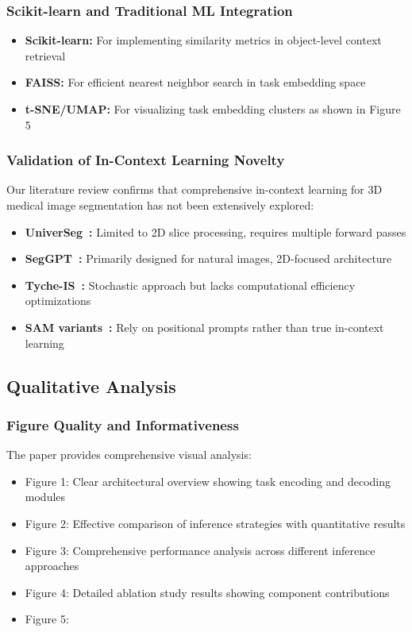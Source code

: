 \subsubsection{Scikit-learn and Traditional ML Integration}
\begin{itemize}
    \item \textbf{Scikit-learn:} For implementing similarity metrics in object-level context retrieval
    \item \textbf{FAISS:} For efficient nearest neighbor search in task embedding space
    \item \textbf{t-SNE/UMAP:} For visualizing task embedding clusters as shown in Figure 5
\end{itemize}

\subsubsection{Validation of In-Context Learning Novelty}
Our literature review confirms that comprehensive in-context learning for 3D medical image segmentation has not been extensively explored:
\begin{itemize}
    \item \textbf{UniverSeg~\cite{butoi2023universeg}:} Limited to 2D slice processing, requires multiple forward passes
    \item \textbf{SegGPT~\cite{wang2023seggpt}:} Primarily designed for natural images, 2D-focused architecture
    \item \textbf{Tyche-IS~\cite{rakic2024tyche}:} Stochastic approach but lacks computational efficiency optimizations
    \item \textbf{SAM variants~\cite{cheng2023sam,wang2024sam}:} Rely on positional prompts rather than true in-context learning
\end{itemize}

\subsection{Qualitative Analysis}
\subsubsection{Figure Quality and Informativeness}
The paper provides comprehensive visual analysis:
\begin{itemize}
    \item Figure 1: Clear architectural overview showing task encoding and decoding modules
    \item Figure 2: Effective comparison of inference strategies with quantitative results
    \item Figure 3: Comprehensive performance analysis across different inference approaches
    \item Figure 4: Detailed ablation study results showing component contributions
    \item Figure 5: 
\end{itemize}

